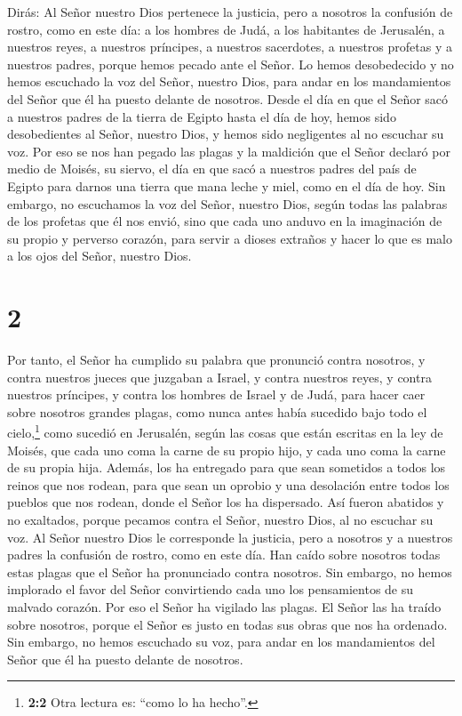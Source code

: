  Dirás: Al Señor nuestro Dios pertenece la justicia, pero
a nosotros la confusión de rostro, como en este día: a los hombres de
Judá, a los habitantes de Jerusalén,  a nuestros reyes, a
nuestros príncipes, a nuestros sacerdotes, a nuestros profetas y a
nuestros padres,  porque hemos pecado ante el Señor.
 Lo hemos desobedecido y no hemos escuchado la voz del
Señor, nuestro Dios, para andar en los mandamientos del Señor que él ha
puesto delante de nosotros.  Desde el día en que el Señor
sacó a nuestros padres de la tierra de Egipto hasta el día de hoy, hemos
sido desobedientes al Señor, nuestro Dios, y hemos sido negligentes al
no escuchar su voz.  Por eso se nos han pegado las plagas
y la maldición que el Señor declaró por medio de Moisés, su siervo, el
día en que sacó a nuestros padres del país de Egipto para darnos una
tierra que mana leche y miel, como en el día de hoy.  Sin
embargo, no escuchamos la voz del Señor, nuestro Dios, según todas las
palabras de los profetas que él nos envió,  sino que cada
uno anduvo en la imaginación de su propio y perverso corazón, para
servir a dioses extraños y hacer lo que es malo a los ojos del Señor,
nuestro Dios.

\hypertarget{section-1}{%
\section{2}\label{section-1}}

 Por tanto, el Señor ha cumplido su palabra que pronunció
contra nosotros, y contra nuestros jueces que juzgaban a Israel, y
contra nuestros reyes, y contra nuestros príncipes, y contra los hombres
de Israel y de Judá,  para hacer caer sobre nosotros
grandes plagas, como nunca antes había sucedido bajo todo el
cielo,\footnote{\textbf{2:2} Otra lectura es: ``como lo ha hecho''.}
como sucedió en Jerusalén, según las cosas que están escritas en la ley
de Moisés,  que cada uno coma la carne de su propio hijo,
y cada uno coma la carne de su propia hija.  Además, los
ha entregado para que sean sometidos a todos los reinos que nos rodean,
para que sean un oprobio y una desolación entre todos los pueblos que
nos rodean, donde el Señor los ha dispersado.  Así fueron
abatidos y no exaltados, porque pecamos contra el Señor, nuestro Dios,
al no escuchar su voz.  Al Señor nuestro Dios le
corresponde la justicia, pero a nosotros y a nuestros padres la
confusión de rostro, como en este día.  Han caído sobre
nosotros todas estas plagas que el Señor ha pronunciado contra nosotros.
 Sin embargo, no hemos implorado el favor del Señor
convirtiendo cada uno los pensamientos de su malvado corazón.
 Por eso el Señor ha vigilado las plagas. El Señor las ha
traído sobre nosotros, porque el Señor es justo en todas sus obras que
nos ha ordenado.  Sin embargo, no hemos escuchado su voz,
para andar en los mandamientos del Señor que él ha puesto delante de
nosotros.

